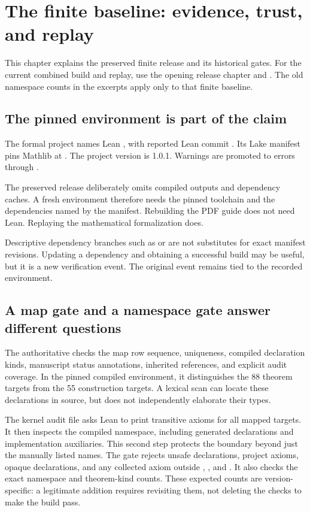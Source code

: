\clearpage
\section{The finite baseline: evidence, trust, and replay}
This chapter explains the preserved finite release and its historical gates. For the current combined build and replay, use the opening release chapter and . The old namespace counts in the excerpts apply only to that finite baseline.
\subsection{The pinned environment is part of the claim}
The formal project names Lean , with reported Lean commit . Its Lake manifest pins Mathlib at . The project version is 1.0.1. Warnings are promoted to errors through .

The preserved release deliberately omits compiled outputs and dependency caches. A fresh environment therefore needs the pinned toolchain and the dependencies named by the manifest. Rebuilding the PDF guide does not need Lean. Replaying the mathematical formalization does.

Descriptive dependency branches such as  or  are not substitutes for exact manifest revisions. Updating a dependency and obtaining a successful build may be useful, but it is a new verification event. The original event remains tied to the recorded environment.

\subsection{A map gate and a namespace gate answer different questions}
The authoritative  checks the map row sequence, uniqueness, compiled declaration kinds, manuscript status annotations, inherited references, and explicit audit coverage. In the pinned compiled environment, it distinguishes the 88 theorem targets from the 55 construction targets. A lexical scan can locate these declarations in source, but does not independently elaborate their types.

The kernel audit file asks Lean to print transitive axioms for all mapped targets. It then inspects the compiled  namespace, including generated declarations and implementation auxiliaries. This second step protects the boundary beyond just the manually listed names.
The gate rejects unsafe declarations, project axioms, opaque declarations, and any collected axiom outside , , and . It also checks the exact namespace and theorem-kind counts. These expected counts are version-specific: a legitimate addition requires revisiting them, not deleting the checks to make the build pass.

